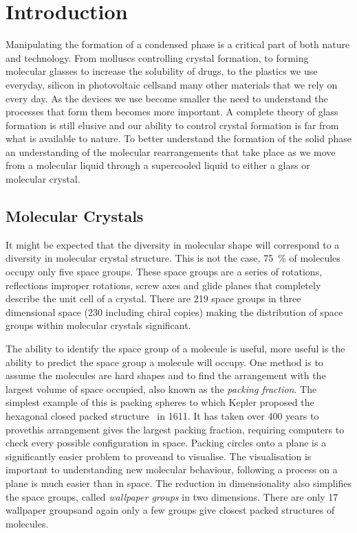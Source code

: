 
\chapter{Introduction}


Manipulating the formation of a condensed phase is a critical part of both nature and technology. From molluscs controlling crystal formation\tocite, to forming molecular glasses to increase the solubility of drugs\tocite, to the plastics we use everyday\tocite, silicon in photovoltaic cells\tocite and many other materials that we rely on every day. As the devices we use become smaller the need to understand the processes that form them becomes more important. A complete theory of glass formation is still elusive and our ability to control crystal formation is far from what is available to nature. To better understand the formation of the solid phase an understanding of the molecular rearrangements that take place as we move from a molecular liquid through a supercooled liquid to either a glass or molecular crystal.

\section{Molecular Crystals}

It might be expected that the diversity in molecular shape will correspond to a diversity in molecular crystal structure. This is not the case, \SI{75}{\percent} of molecules occupy only five space groups\tocite. These space groups are a series of rotations, reflections improper rotations, screw axes and glide planes that completely describe the unit cell of a crystal. There are 219 space groups in three dimensional space (230 including chiral copies) making the distribution of space groups within molecular crystals significant.

The ability to identify the space group of a molecule is useful, more useful is the ability to predict the space group a molecule will occupy. One method is to assume the molecules are hard shapes and to find the arrangement with the largest volume of space occupied\tocite, also known as the \emph{packing fraction}.  The simplest example of this is packing spheres to which Kepler proposed the hexagonal closed packed structure~\figref{} in 1611\tocite. It has taken over 400 years to prove\tocite this arrangement gives the largest packing fraction, requiring computers to check every possible configuration in space. Packing circles onto a plane is a significantly easier problem to prove\tocite and to visualise\figref. The visualisation is important to understanding new molecular behaviour, following a process on a plane is much easier than in space. The reduction in dimensionality also simplifies the space groups, called \emph{wallpaper groups} in two dimensions. There are only 17 wallpaper groups\figref and again only a few groups give closest packed structures of molecules\tocite.

